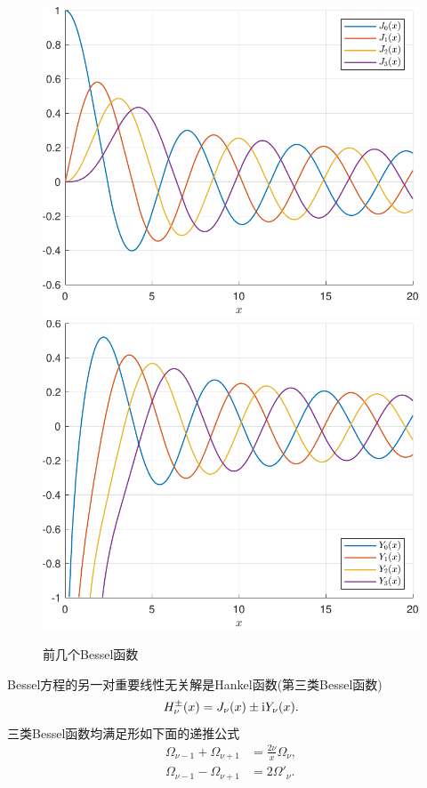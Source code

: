 \begin{figure}[!htp]
    \centering
      {\includegraphics[width=0.45\linewidth]{graphs/BesselJ.pdf}}
      {\includegraphics[width=0.45\linewidth]{graphs/BesselY.pdf}}
    \caption{前几个Bessel函数}
    \label{fig:Bessel function}
\end{figure}

Bessel方程的另一对重要线性无关解是Hankel函数(第三类Bessel函数)
\begin{equation}
    H_\nu^\pm(x)=J_\nu(x)\pm\mathrm{i} Y_\nu(x).
\end{equation}
三类Bessel函数均满足形如下面的递推公式
\begin{align*}
    \Omega_{\nu-1}+\Omega_{\nu+1}&=\frac{2\nu}x\Omega_\nu,\\
    \Omega_{\nu-1}-\Omega_{\nu+1}&=2\Omega'_\nu.
\end{align*}


